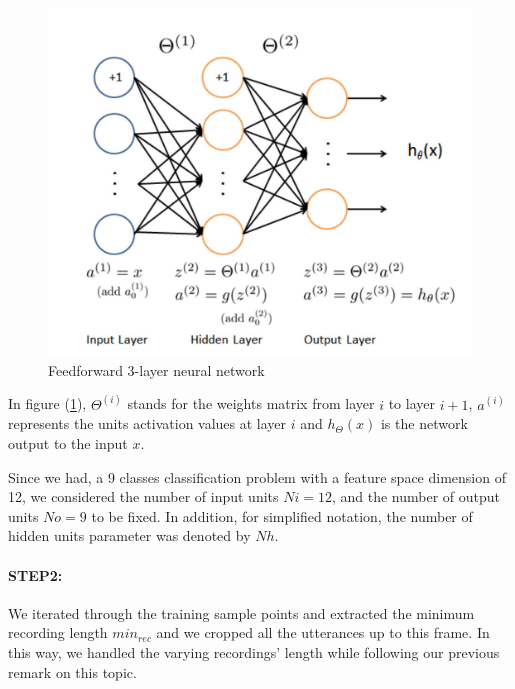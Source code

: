 \documentclass[a4paper,10pt]{article}
\begin{document}
\begin{figure}[ht!]
\centering
\includegraphics[scale=0.5]{ffnn}
\caption{Feedforward 3-layer neural network}\label{fig:ffnn}
\end{figure}

In figure (\ref{fig:ffnn}), $\Theta^{(i)}$ stands for the weights matrix from layer $i$ to layer $i+1$, $a^{(i)}$ represents the units activation values at layer $i$ and $h_{\Theta}(x)$ is the network output to the input $x$. 

Since we had, a 9 classes classification problem with a feature space dimension of 12, we considered the number of input units $Ni = 12$, and the number of output units $No = 9$ to be fixed. In addition, for simplified notation, the number of hidden units parameter was denoted by $Nh$. 

\paragraph{STEP2:}We iterated through the training sample points and extracted the minimum recording length $min_{rec}$ and we cropped all the utterances up to this frame. In this way, we handled the varying recordings' length while following our previous remark on this topic.
\end{document}
